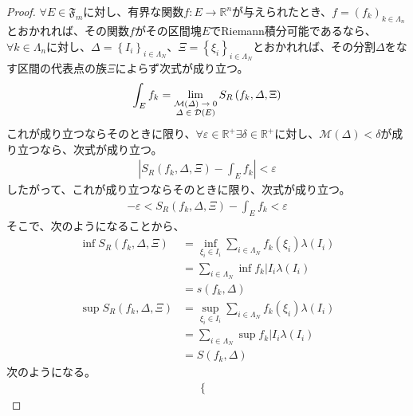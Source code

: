 \documentclass[dvipdfmx]{jsarticle}
\begin{document}
\begin{proof}
$\forall E \in \mathfrak{F}_{m}$に対し、有界な関数$f:E \rightarrow \mathbb{R}^{n}$が与えられたとき、$f = \left( f_{k} \right)_{k \in \varLambda_{n}}$とおかれれば、その関数$f$がその区間塊$E$でRiemann積分可能であるなら、$\forall k \in \varLambda_{n}$に対し、$\varDelta = \left\{ I_{i} \right\}_{i \in \varLambda_{N}}$、$\Xi = \left\{ \xi_{i} \right\}_{i \in \varLambda_{N}}$とおかれれば、その分割$\varDelta$をなす区間の代表点の族$\Xi$によらず次式が成り立つ。
\begin{align*}
\int_{E} f_{k} = \lim_{\scriptsize \begin{matrix}
\mathcal{M}(\varDelta) \rightarrow 0 \\
\varDelta \in \mathcal{D}(E) \\
\end{matrix}}{S_{R}\left( f_{k},\varDelta,\Xi \right)}
\end{align*}
これが成り立つならそのときに限り、$\forall\varepsilon \in \mathbb{R}^{+}\exists\delta \in \mathbb{R}^{+}$に対し、$\mathcal{M}(\varDelta) < \delta$が成り立つなら、次式が成り立つ。
\begin{align*}
\left| S_{R}\left( f_{k},\varDelta,\Xi \right) - \int_{E} f_{k} \right| < \varepsilon
\end{align*}
したがって、これが成り立つならそのときに限り、次式が成り立つ。
\begin{align*}
- \varepsilon < S_{R}\left( f_{k},\varDelta,\Xi \right) - \int_{E} f_{k} < \varepsilon
\end{align*}
そこで、次のようになることから、
\begin{align*}
\inf{S_{R}\left( f_{k},\varDelta,\Xi \right)} &= \inf_{\xi_{i} \in I_{i}}{\sum_{i \in \varLambda_{N}} {f_{k}\left( \xi_{i} \right)\lambda\left( I_{i} \right)}}\\
&= \sum_{i \in \varLambda_{N}} {\inf{f_{k}|I_{i}}\lambda\left( I_{i} \right)}\\
&= s\left( f_{k},\varDelta \right)\\
\sup{S_{R}\left( f_{k},\varDelta,\Xi \right)} &= \sup_{\xi_{i} \in I_{i}}{\sum_{i \in \varLambda_{N}} {f_{k}\left( \xi_{i} \right)\lambda\left( I_{i} \right)}}\\
&= \sum_{i \in \varLambda_{N}} {\sup{f_{k}|I_{i}}\lambda\left( I_{i} \right)}\\
&= S\left( f_{k},\varDelta \right)
\end{align*}
次のようになる。
\begin{align*}
\left\{ \begin{matrix}

\end{matrix}
\end{align*}
\end{proof}
\end{document}
